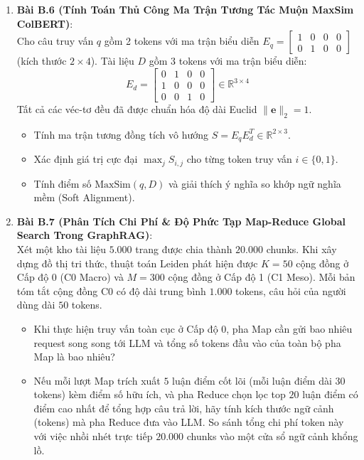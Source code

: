 \begin{enumerate}
  \item \textbf{Bài B.6 (Tính Toán Thủ Công Ma Trận Tương Tác Muộn MaxSim ColBERT)}: \\
  Cho câu truy vấn $q$ gồm 2 tokens với ma trận biểu diễn $E_q = \begin{bmatrix} 1 & 0 & 0 & 0 \\ 0 & 1 & 0 & 0 \end{bmatrix}$ (kích thước $2 \times 4$).
  Tài liệu $D$ gồm 3 tokens với ma trận biểu diễn:
  \begin{equation*}
  E_d = \begin{bmatrix} 0 & 1 & 0 & 0 \\ 1 & 0 & 0 & 0 \\ 0 & 0 & 1 & 0 \end{bmatrix} \in \mathbb{R}^{3 \times 4}
  \end{equation*}
  Tất cả các véc-tơ đều đã được chuẩn hóa độ dài Euclid $\|\mathbf{e}\|_2 = 1$.
  \begin{itemize}
    \item[a)] Tính ma trận tương đồng tích vô hướng $S = E_q E_d^T \in \mathbb{R}^{2 \times 3}$.
    \item[b)] Xác định giá trị cực đại $\max_{j} S_{i, j}$ cho từng token truy vấn $i \in \{0, 1\}$.
    \item[c)] Tính điểm số $\text{MaxSim}(q, D)$ và giải thích ý nghĩa so khớp ngữ nghĩa mềm (Soft Alignment).
  \end{itemize}

  \item \textbf{Bài B.7 (Phân Tích Chi Phí \& Độ Phức Tạp Map-Reduce Global Search Trong GraphRAG)}: \\
  Xét một kho tài liệu $5.000$ trang được chia thành $20.000$ chunks.
  Khi xây dựng đồ thị tri thức, thuật toán Leiden phát hiện được $K = 50$ cộng đồng ở Cấp độ 0 (C0 Macro) và $M = 300$ cộng đồng ở Cấp độ 1 (C1 Meso).
  Mỗi bản tóm tắt cộng đồng C0 có độ dài trung bình $1.000$ tokens, câu hỏi của người dùng dài $50$ tokens.
  \begin{itemize}
    \item[a)] Khi thực hiện truy vấn toàn cục ở Cấp độ 0, pha Map cần gửi bao nhiêu request song song tới LLM và tổng số tokens đầu vào của toàn bộ pha Map là bao nhiêu?
    \item[b)] Nếu mỗi lượt Map trích xuất $5$ luận điểm cốt lõi (mỗi luận điểm dài $30$ tokens) kèm điểm số hữu ích, và pha Reduce chọn lọc top $20$ luận điểm có điểm cao nhất để tổng hợp câu trả lời, hãy tính kích thước ngữ cảnh (tokens) mà pha Reduce đưa vào LLM. So sánh tổng chi phí token này với việc nhồi nhét trực tiếp $20.000$ chunks vào một cửa sổ ngữ cảnh khổng lồ.
  \end{itemize}
\end{enumerate}


